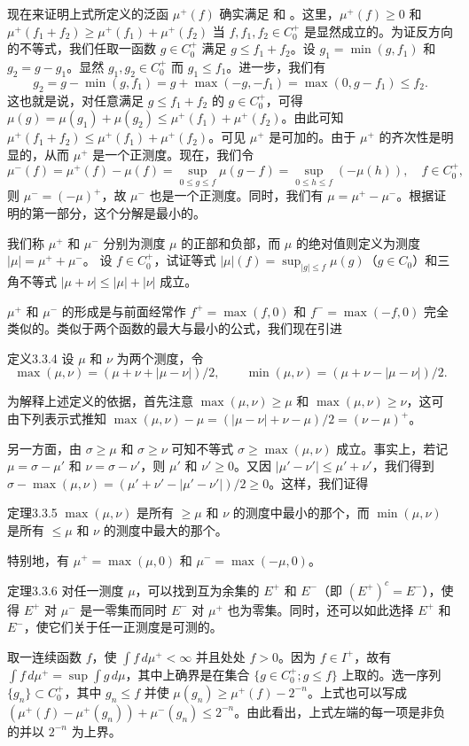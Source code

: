 现在来证明上式所定义的泛函 $\mu^+(f)$ 确实满足  和 。这里，$\mu^+(f)\ge0$ 和 $\mu^+(f_1+f_2)\ge\mu^+(f_1)+\mu^+(f_2)$ 当 $f,f_1,f_2\in C_0^+$ 是显然成立的。为证反方向的不等式，我们任取一函数 $g\in C_0^+$ 满足 $g\le f_1+f_2$。设 $g_1=\min(g,f_1)$ 和 $g_2=g-g_1$。显然 $g_1,g_2\in C_0^+$ 而 $g_1\le f_1$。进一步，我们有
\[g_2=g-\min(g,f_1)=g+\max(-g,-f_1)=\max(0,g-f_1)\le f_2.\]
这也就是说，对任意满足 $g\le f_1+f_2$ 的 $g\in C_0^+$，可得 $\mu(g)=\mu(g_1)+\mu(g_2)\le\mu^+(f_1)+\mu^+(f_2)$。由此可知
$\mu^+(f_1+f_2)\le\mu^+(f_1)+\mu^+(f_2)$。可见 $\mu^+$ 是可加的。由于 $\mu^+$ 的齐次性是明显的，从而 $\mu^+$ 是一个正测度。现在，我们令
\[\mu^-(f)=\mu^+(f)-\mu(f)=\sup_{0\le g\le f}\mu(g-f)=\sup_{0\le h\le f}(-\mu(h)),\quad f\in C_0^+,\]
则 $\mu^-=(-\mu)^+$，故 $\mu^-$ 也是一个正测度。同时，我们有 $\mu=\mu^+-\mu^-$。根据证明的第一部分，这个分解是最小的。

我们称 $\mu^+$ 和 $\mu^-$ 分别为测度 $\mu$ 的正部和负部，而 $\mu$ 的绝对值则定义为测度 $|\mu|=\mu^++\mu^-$。
\Exercise 设 $f\in C_0^+$，试证等式 $|\mu|(f)=\sup_{|g|\le f}\mu(g)$（$g\in C_0$）和三角不等式 $|\mu+\nu|\le|\mu|+|\nu|$ 成立。

$\mu^+$ 和 $\mu^-$ 的形成是与前面经常作 $f^+=\max(f,0)$ 和 $f^-=\max(-f,0)$ 完全类似的。类似于两个函数的最大与最小的公式，我们现在引进
\begin{statement}{定义}{3.3.4}
设 $\mu$ 和 $\nu$ 为两个测度，令
\[\max(\mu,\nu)=(\mu+\nu+|\mu-\nu|)/2,\qquad\min(\mu,\nu)=(\mu+\nu-|\mu-\nu|)/2.\]
\end{statement}
为解释上述定义的依据，首先注意 $\max(\mu,\nu)\ge\mu$ 和 $\max(\mu,\nu)\ge\nu$，这可由下列表示式推知 $\max(\mu,\nu)-\mu=(|\mu-\nu|+\nu-\mu)/2=(\nu-\mu)^+$。

另一方面，由 $\sigma\ge\mu$ 和 $\sigma\ge\nu$ 可知不等式 $\sigma\ge\max(\mu,\nu)$ 成立。事实上，若记 $\mu=\sigma-\mu'$ 和 $\nu=\sigma-\nu'$，则 $\mu'$ 和 $\nu'\ge0$。又因 $|\mu'-\nu'|\le\mu'+\nu'$，我们得到 $\sigma-\max(\mu,\nu)=(\mu'+\nu'-|\mu'-\nu'|)/2\ge0$。这样，我们证得
\begin{statement}{定理}{3.3.5}
$\max(\mu,\nu)$ 是所有 $\ge\mu$ 和 $\nu$ 的测度中最小的那个，而 $\min(\mu,\nu)$ 是所有 $\le\mu$ 和 $\nu$ 的测度中最大的那个。
\end{statement}
特别地，有 $\mu^+=\max(\mu,0)$ 和 $\mu^-=\max(-\mu,0)$。
\begin{statement}{定理}{3.3.6}
对任一测度 $\mu$，可以找到互为余集的 $E^+$ 和 $E^-$（即 $(E^+)^c=E^-$），使得 $E^+$ 对 $\mu^-$ 是一零集而同时 $E^-$ 对 $\mu^+$ 也为零集。同时，还可以如此选择 $E^+$ 和 $E^-$，使它们关于任一正测度是可测的。
\end{statement}
\Proof 取一连续函数 $f$，使 $\int f\,d\mu^+<\infty$ 并且处处 $f>0$。因为 $f\in I^+$，故有 $\int f\,d\mu^+=\sup\int g\,d\mu$，其中上确界是在集合 $\{g\in C_0^+;g\le f\}$ 上取的。选一序列 $\{g_n\}\subset C_0^+$，其中 $g_n\le f$ 并使 $\mu(g_n)\ge\mu^+(f)-2^{-n}$。上式也可以写成 $(\mu^+(f)-\mu^+(g_n))+\mu^-(g_n)\le2^{-n}$。由此看出，上式左端的每一项是非负的并以 $2^{-n}$ 为上界。

